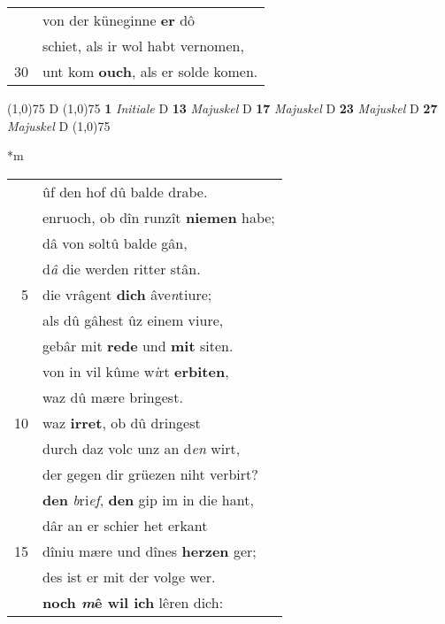 \documentclass[8pt,a4paper,notitlepage]{article}
\begin{document}
\begin{table}[ht]
\begin{minipage}[t]{0.5\linewidth}
\begin{tabular}{rl}
 & von der küneginne \textbf{er} dô\\ 
 & schiet, als ir wol habt vernomen,\\ 
30 & unt kom \textbf{ouch}, als er solde komen.\\ 
\end{tabular}
\scriptsize
\line(1,0){75} \newline
D \newline
\line(1,0){75} \newline
\textbf{1} \textit{Initiale} D  \textbf{13} \textit{Majuskel} D  \textbf{17} \textit{Majuskel} D  \textbf{23} \textit{Majuskel} D  \textbf{27} \textit{Majuskel} D  \newline
\line(1,0){75} \newline
\newline
\end{minipage}
\hspace{0.5cm}
\begin{minipage}[t]{0.5\linewidth}
\small
\begin{center}*m
\end{center}
\begin{tabular}{rl}
 & ûf den hof dû balde drabe.\\ 
 & enruoch, ob dîn runzît \textbf{niemen} habe;\\ 
 & dâ von soltû balde gân,\\ 
 & d\textit{â} die werden ritter stân.\\ 
5 & die vrâgent \textbf{dich} âve\textit{n}tiure;\\ 
 & als dû gâhest ûz einem viure,\\ 
 & gebâr mit \textbf{rede} und \textbf{mit} siten.\\ 
 & von in vil kûme w\textit{i}rt \textbf{erbiten},\\ 
 & waz dû mære bringest.\\ 
10 & waz \textbf{irret}, ob dû dringest\\ 
 & durch daz volc unz an d\textit{en} wirt,\\ 
 & der gegen dir grüezen niht verbirt?\\ 
 & \textbf{den} \textit{b}ri\textit{ef}, \textbf{den} gip im in die hant,\\ 
 & dâr an er schier het erkant\\ 
15 & dîniu mære und dînes \textbf{herzen} ger;\\ 
 & des ist er mit der volge wer.\\ 
 & \textbf{noch \textit{m}ê wil ich} lêren dich:\\ 

\end{tabular}
\end{minipage}
\end{table}
\end{document}

